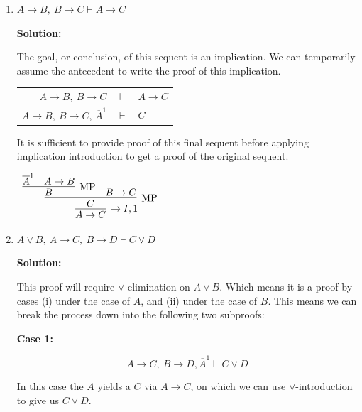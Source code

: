 \documentclass[11pt]{report}
\newcommand{\temp}[2]{{\overline{#2}}^{#1}}
\begin{document}
\begin{enumerate}
\begin{enumerate}
		\begin{center}
			$\begin{array}{c}
				\infer[\to I, 1]{A \to (B \lor C)}
					{\infer[\lor I_{L}]{B \lor C}
						{\infer[\MP]{B}
							{\temp{1}{\cancel{A}}
						&
						A \to B}}}
			\end{array}$
		\end{center}

		\newpage
		\item $ A\rightarrow  B, \  B \rightarrow  C \vdash  A\rightarrow  C $

		\textbf{Solution:}
		
		The goal, or conclusion, of this sequent is an implication. We can temporarily assume the antecedent to write the proof of this implication. 

		\begin{center}
			\begin{tabular}{r c l}
				$ A\rightarrow  B, \ B \rightarrow  C$ & $\vdash$ & $A \to C$ \\
				$ A\rightarrow  B, \ B \rightarrow C$, $\temp{1}{A}$ & $\vdash$ & $C$ \\				
			\end{tabular}
		\end{center}

		It is sufficient to provide proof of this final sequent before applying implication introduction to get a proof of the original sequent.

		\begin{center}
			$\begin{array}{c}
				\infer[\to I, 1]{A \to C}
					{\infer[\MP]{C}
						{\infer[\MP]{B}
							{\temp{1}{A}
							&
							A \to B}
						&
						B \to C}}
			\end{array}$
		\end{center}

		\item $A \lor B, \ A \to C, \ B \to D \vdash C \lor D$		
		
		\textbf{Solution:}

		This proof will require $\lor$ elimination on $A \lor B$. Which means it is a proof by cases (i) under the case of $A$, and (ii) under the case of $B$. This means we can break the process down into the following two subproofs: 

		\textbf{Case 1:}

		$$A \to C, \ B \to D, \temp{1}{A} \vdash C \lor D$$

		In this case the $A$ yields a $C$ via $A \to C$, on which we can use $\lor$-introduction to give us $C \lor D$. 


\end{enumerate}
\end{enumerate}
\end{document}
